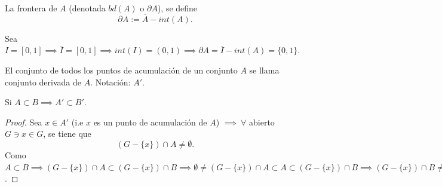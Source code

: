\begin{definicion}
	La frontera de $A$ (denotada $bd(A)$ o $\partial A$), se define $$\partial A := \overline{A}-int(A).$$
	\begin{ejemplo}
		Sea $I=[0,1]\implies \overline{I}=[0,1]\implies int(I)=(0,1)\implies \partial A = \overline{I}-int(A)=\{0,1\}$. 
	\end{ejemplo}
\end{definicion}

\begin{definicion}
	El conjunto de todos los puntos de acumulación de un conjunto $A$ se llama conjunto derivada de $A$. Notación: $A'$. 
\end{definicion}

\begin{prop}
 Si $A\subset B\implies A'\subset B'$. \begin{proof}
			Sea $x\in A'$ (i.e $x$ es un punto de acumulación de $A$) $\implies \ \forall $ abierto $G\ni x\in G$, se tiene que 
			$$(G-\{x\})\cap A\neq \emptyset.$$
			Como $A\subset B\implies (G-\{x\})\cap A\subset (G-\{x\})\cap B\implies \emptyset \neq (G-\{x\})\cap A\subset A \subset (G-\{x\})\cap B\implies (G-\{x\})\cap B\neq \emptyset, \forall G\ni x\in G\implies x\in B'$. 
		\end{proof}
\end{prop}

